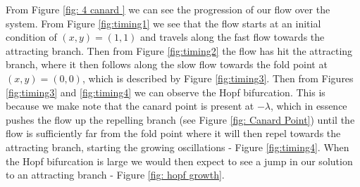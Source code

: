 From Figure \ref{fig: 4 canard } we can see the progression of our flow over the system. From Figure \ref{fig:timing1} we see that the flow starts at an initial condition of $ (x,y)=(1,1) $ and travels along the fast flow towards the attracting branch. Then from Figure \ref{fig:timing2} the flow has hit the attracting branch, where it then follows along the slow flow towards the fold point at $ (x,y)=(0,0) $, which is described by Figure \ref{fig:timing3}. Then from Figures \ref{fig:timing3} and \ref{fig:timing4} we can observe the Hopf bifurcation. This is because we make note that the canard point is present at $ -\lambda $, which in essence pushes the flow up the repelling branch (see Figure \ref{fig: Canard Point}) until the flow is sufficiently far from the fold point where it will then repel towards the attracting branch, starting the growing oscillations - Figure \ref{fig:timing4}. When the Hopf bifurcation is large we would then expect to see a jump in our solution to an attracting branch - Figure \ref{fig: hopf growth}.

